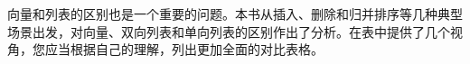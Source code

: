 向量和列表的区别也是一个重要的问题。本书从插入、删除和归并排序等几种典型场景出发，对向量、双向列表和单向列表的区别作出了分析。在表中提供了几个视角，您应当根据自己的理解，列出更加全面的对比表格。






